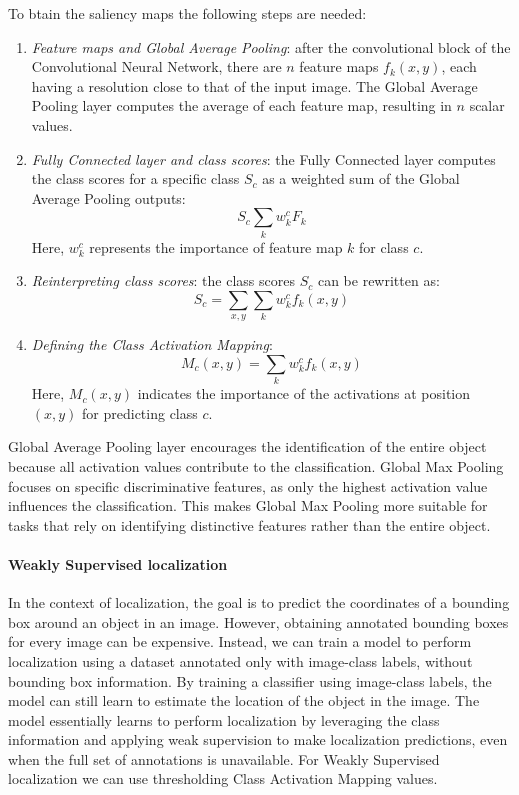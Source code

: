 To btain the saliency maps the following steps are needed: 
\begin{enumerate}
    \item \textit{Feature maps and Global Average Pooling}: after the convolutional block of the Convolutional Neural Network, there are $n$ feature maps $f_k(x,y)$, each having a resolution close to that of the input image.
        The Global Average Pooling layer computes the average of each feature map, resulting in $n$ scalar values. 
    \item \textit{Fully Connected layer and class scores}: the Fully Connected layer computes the class scores for a specific class $S_c$ as a weighted sum of the Global Average Pooling outputs:
        \[S_c\sum_{k}w_k^cF_k\]
        Here, $w^c_k$ represents the importance of feature map $k$ for class $c$.
    \item \textit{Reinterpreting class scores}: the class scores $S_c$ can be rewritten as:
        \[S_c=\sum_{x,y}\sum_kw_k^cf_k(x,y)\]
    \item \textit{Defining the Class Activation Mapping}: 
        \[M_c(x,y)=\sum_kw_k^cf_k(x,y)\]
        Here, $M_c(x,y)$ indicates the importance of the activations at position $(x,y)$ for predicting class $c$. 
\end{enumerate}
Global Average Pooling layer encourages the identification of the entire object because all activation values contribute to the classification.
Global Max Pooling focuses on specific discriminative features, as only the highest activation value influences the classification. 
This makes Global Max Pooling more suitable for tasks that rely on identifying distinctive features rather than the entire object.

\paragraph*{Weakly Supervised localization}
In the context of localization, the goal is to predict the coordinates of a bounding box around an object in an image. 
However, obtaining annotated bounding boxes for every image can be expensive.
Instead, we can train a model to perform localization using a dataset annotated only with image-class labels, without bounding box information.
By training a classifier using image-class labels, the model can still learn to estimate the location of the object in the image. 
The model essentially learns to perform localization by leveraging the class information and applying weak supervision to make localization predictions, even when the full set of annotations is unavailable.
For Weakly Supervised localization we can use thresholding Class Activation Mapping values. 


